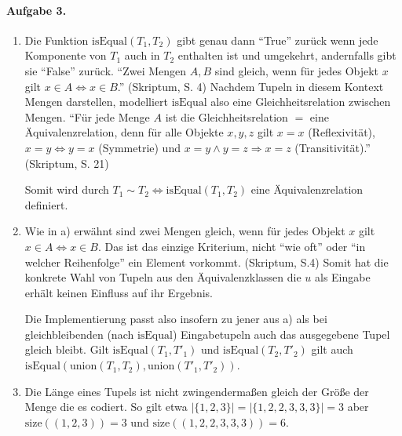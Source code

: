 \documentclass{article}
\begin{document}
\paragraph{Aufgabe 3.}

\begin{enumerate}[label=\alph*)]
    \item Die Funktion $\text{isEqual}(T_1, T_2)$ gibt genau dann \enquote{True} zurück wenn jede Komponente von $T_1$ auch in $T_2$ enthalten ist und umgekehrt, andernfalls gibt sie \enquote{False} zurück. \enquote{Zwei Mengen $A, B$ sind gleich, wenn für jedes Objekt $x$ gilt $x \in A \Leftrightarrow x \in B$.} (Skriptum, S. 4) Nachdem Tupeln in diesem Kontext Mengen darstellen, modelliert $\text{isEqual}$ also eine Gleichheitsrelation zwischen Mengen. \enquote{Für jede Menge $A$ ist die Gleichheitsrelation $=$ eine Äquivalenzrelation, denn für alle Objekte $x, y ,z$ gilt $x = x$ (Reflexivität), $x = y \Leftrightarrow y = x$ (Symmetrie) und $x = y \land y = z \Rightarrow x = z$ (Transitivität).} (Skriptum, S. 21)

    Somit wird durch $T_1 \sim T_2 \Leftrightarrow \text{isEqual}(T_1, T_2)$ eine Äquivalenzrelation definiert.

    \item Wie in a) erwähnt sind zwei Mengen gleich, wenn für jedes Objekt $x$ gilt $x \in A \Leftrightarrow x \in B$. Das ist das einzige Kriterium, nicht \enquote{wie oft} oder \enquote{in welcher Reihenfolge} ein Element vorkommt. (Skriptum, S.4) Somit hat die konkrete Wahl von Tupeln aus den Äquivalenzklassen die $u$ als Eingabe erhält keinen Einfluss auf ihr Ergebnis.
    
    Die Implementierung passt also insofern zu jener aus a) als bei gleichbleibenden (nach $\text{isEqual}$) Eingabetupeln auch das ausgegebene Tupel gleich bleibt. Gilt $\text{isEqual}(T_1, T'_1)$ und $\text{isEqual}(T_2, T'_2)$ gilt auch $\text{isEqual}(\text{union}(T_1, T_2), \text{union}(T'_1, T'_2))$.

    \item Die Länge eines Tupels ist nicht zwingendermaßen gleich der Größe der Menge die es codiert. So gilt etwa $\lvert\{ 1, 2, 3 \}\rvert = \lvert\{ 1, 2, 2, 3, 3, 3 \}\rvert = 3$ aber $\text{size}((1, 2, 3)) = 3$ und $\text{size}((1, 2, 2, 3, 3, 3)) = 6$.
\end{enumerate}
\end{document}
